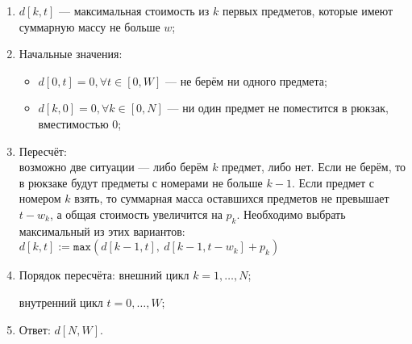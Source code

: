 \begin{enumerate}
\item $d\left[k, t\right]$ --- максимальная стоимость из $k$ первых предметов, которые имеют суммарную массу не больше $w$;
\item Начальные значения:
	\begin{itemize}
	\item $d\left[0, t\right] = 0, \forall t \in \left[0, W\right]$ --- не берём ни одного предмета;
	\item $d\left[k, 0\right] = 0, \forall k \in \left[0, N\right]$ --- ни один предмет не поместится в рюкзак, вместимостью 0;
	\end{itemize}
\item Пересчёт:\\
	возможно две ситуации --- либо берём $k$ предмет, либо нет.
	Если не берём, то в рюкзаке будут предметы с номерами не больше $k - 1$.
	Если предмет с номером $k$ взять, то суммарная масса оставшихся предметов не превышает $t - w_k$,
	а общая стоимость увеличится на $p_k$. Необходимо выбрать максимальный из этих вариантов:\\
	$d\left[k, t\right] := \mathtt{max}\left(d\left[k - 1, t\right],\ d\left[k - 1, t - w_k\right] + p_k\right)$
\item Порядок пересчёта:
	внешний цикл
	$k = 1, \dots, N$;

	внутренний цикл $t = 0, \dots, W$;
\item Ответ: $d\left[N, W\right]$.
\end{enumerate}